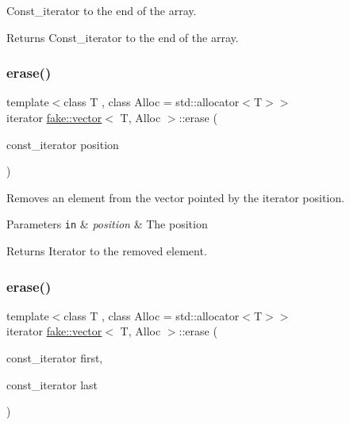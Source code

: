 Const\+\_\+iterator to the end of the array. 

\begin{DoxyReturn}{Returns}
Const\+\_\+iterator to the end of the array. 
\end{DoxyReturn}
\mbox{\label{classfake_1_1vector_a9f770760191adfcaab0f08dc29689d48}} 
\subsubsection{\texorpdfstring{erase()}{erase()}\hspace{0.1cm}{\footnotesize\ttfamily [1/2]}}
{\footnotesize\ttfamily template$<$class T , class Alloc  = std\+::allocator$<$\+T$>$$>$ \\
iterator \mbox{\hyperlink{classfake_1_1vector}{fake\+::vector}}$<$ T, Alloc $>$\+::erase (\begin{DoxyParamCaption}\item[{const\+\_\+iterator}]{position }\end{DoxyParamCaption})\hspace{0.3cm}{\ttfamily [inline]}}



Removes an element from the vector pointed by the iterator position. 


\begin{DoxyParams}[1]{Parameters}
\mbox{\tt in}  & {\em position} & The position\\
\hline
\end{DoxyParams}
\begin{DoxyReturn}{Returns}
Iterator to the removed element. 
\end{DoxyReturn}
\mbox{\label{classfake_1_1vector_a22a4f0fb6b42d2ec7107bb8194f4106c}} 
\subsubsection{\texorpdfstring{erase()}{erase()}\hspace{0.1cm}{\footnotesize\ttfamily [2/2]}}
{\footnotesize\ttfamily template$<$class T , class Alloc  = std\+::allocator$<$\+T$>$$>$ \\
iterator \mbox{\hyperlink{classfake_1_1vector}{fake\+::vector}}$<$ T, Alloc $>$\+::erase (\begin{DoxyParamCaption}\item[{const\+\_\+iterator}]{first,  }\item[{const\+\_\+iterator}]{last }\end{DoxyParamCaption})\hspace{0.3cm}{\ttfamily [inline]}}



